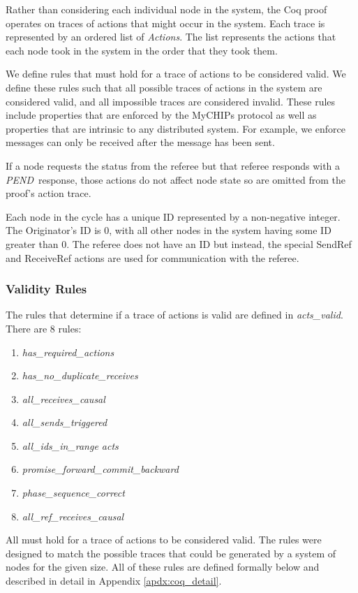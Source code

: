 \documentclass[runningheads]{llncs}
\newcommand{\pend}{\emph{PEND}}
\begin{document}
Rather than considering each individual node in the system, the Coq proof operates on traces of actions that might occur in the system. Each trace is represented by an ordered list of \emph{Actions}. The list represents the actions that each node took in the system in the order that they took them.

We define rules that must hold for a trace of actions to be considered valid. We define these rules such that all possible traces of actions in the system are considered valid, and all impossible traces are considered invalid. These rules include properties that are enforced by the MyCHIPs protocol as well as properties that are intrinsic to any distributed system. For example, we enforce  messages can only be received after the message has been sent.

If a node requests the status from the referee but that referee responds with a \pend\ response, those actions do not affect node state so are omitted from the proof's action trace.

Each node in the cycle has a unique ID represented by a non-negative integer. The Originator's ID is 0, with all other nodes in the system having some ID greater than 0. The referee does not have an ID but instead, the special SendRef and ReceiveRef actions are used for communication with the referee. 

\subsubsection{Validity Rules} \label{sec:validity_rules}
The rules that determine if a trace of actions is valid are defined in \emph{acts\_valid}. There are 8 rules:

\begin{enumerate}
  \itemsep 0pt
  \item \emph{has\_required\_actions}
  \item \emph{has\_no\_duplicate\_receives}
  \item \emph{all\_receives\_causal}
  \item \emph{all\_sends\_triggered}
  \item \emph{all\_ids\_in\_range acts}
  \item \emph{promise\_forward\_commit\_backward}
  \item \emph{phase\_sequence\_correct}
  \item \emph{all\_ref\_receives\_causal}
\end{enumerate}

All must hold for a trace of actions to be considered valid. The rules were designed to match the possible traces that could be generated by a system of nodes for the given size. All of these rules are defined formally below and described in detail in Appendix \ref{apdx:coq_detail}.
\end{document}
